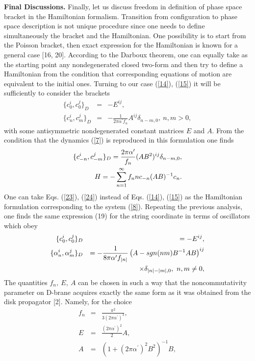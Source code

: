 \documentclass[a4paper]{article}
\begin{document}
\noindent
{\bf Final Discussions.}
Finally, let us discuss freedom in definition of phase space 
bracket in the Hamiltonian formalism. Transition from configuration 
to phase space description is not unique procedure since one needs 
to define simultaneously the bracket and the Hamiltonian. 
One possibility is to start from the Poisson bracket, then exact 
expression for the Hamiltonian is known for a general case [16, 20].
According to the Darboux theorem, one can equally take as the starting 
point any nondegenerated closed two-form and then try to define a 
Hamiltonian from the condition that corresponding equations of motion 
are equivalent to the initial ones. Turning to our case (\ref{14}), 
(\ref{15}) it will be sufficiently to consider the brackets 
\begin{eqnarray}\label{23}
\{c_0^i, c_0^j\}_D&=&-E^{ij}, \nonumber \\  
\{c_n^i, c_m^j\}_D&=&-\frac{1}{2\pi\alpha^\prime f_n}A^{ij}\delta_{n-m,0}, 
~ n, m>0,
\end{eqnarray}
with some antisymmetric nondegenerated constant matrices $E$ and $A$. 
From the condition that the dynamics (\ref{7}) is reproduced in this 
formulation one finds
\begin{eqnarray}\label{24}
\{c_{-n}^i, c_{-m}^j\}_D=\frac{2\pi\alpha^\prime}{f_n}(AB^2)^{ij}
\delta_{n-m,0}, \cr 
H=-\sum_{n=1}^\infty f_nnc_{-n}(AB)^{-1}c_n.
\end{eqnarray}
One can take Eqs. (\ref{23}), (\ref{24}) instead of Eqs. (\ref{14}), 
(\ref{15}) as the Hamiltonian formulation corresponding to the system 
(\ref{8}). Repeating the previous analysis, one finds the same 
expression (19) for the string coordinate in terms of oscillators 
which obey 
\begin{eqnarray}\label{25}
\{c_0^i, c_0^j\}_D&&=-E^{ij}, \nonumber \cr
\{\alpha_n^i, \alpha_m^j\}_D &&=-\frac{1}{8\pi\alpha^\prime f_{\mid n\mid}}
\left(A-sgn(nm)B^{-1}AB\right)^{ij} \nonumber \\
&& \times \delta_{\mid n\mid-\mid m\mid ,0},~ n, m\ne 0,
\end{eqnarray}
The quantities $f_n, ~ E, ~ A$ can be chosen in such a way 
that the noncommutativity parameter on D-brane acquires exactly the same 
form as it was obtained from the disk propagator [2]. Namely, for the 
choice 
\begin{eqnarray}\label{26}
f_n&=&\frac{\pi^2}{3(2\pi\alpha^\prime)^3}, \nonumber \\ 
E&=&\frac{(2\pi\alpha^\prime)^2}{2}A, \nonumber \\ 
A&=&\left(1+(2\pi\alpha^\prime)^2B^2\right)^{-1}B,
\end{eqnarray}
\end{document}
